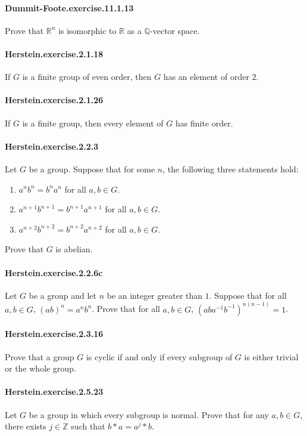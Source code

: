 \documentclass{article}
\begin{document}
\paragraph{Dummit-Foote.exercise.11.1.13} Prove that $\mathbb{R}^n$ is isomorphic to $\mathbb{R}$ as a $\mathbb{Q}$-vector space.

\paragraph{Herstein.exercise.2.1.18} If $G$ is a finite group of even order, then $G$ has an element of order $2$.

\paragraph{Herstein.exercise.2.1.26} If $G$ is a finite group, then every element of $G$ has finite order.

\paragraph{Herstein.exercise.2.2.3} Let $G$ be a group. Suppose that for some $n$, the following three statements hold:
\begin{enumerate}
\item $a^n b^n = b^n a^n$ for all $a, b \in G$.
\item $a^{n+1} b^{n+1} = b^{n+1} a^{n+1}$ for all $a, b \in G$.
\item $a^{n+2} b^{n+2} = b^{n+2} a^{n+2}$ for all $a, b \in G$.
\end{enumerate}
Prove that $G$ is abelian.

\paragraph{Herstein.exercise.2.2.6c} Let $G$ be a group and let $n$ be an integer greater than $1$. Suppose that for all $a, b\in G$, $(ab)^n=a^nb^n$. Prove that for all $a, b\in G$, $(aba^{-1}b^{-1})^{n(n-1)}=1$.

\paragraph{Herstein.exercise.2.3.16} Prove that a group $G$ is cyclic if and only if every subgroup of $G$ is either trivial or the whole group.

\paragraph{Herstein.exercise.2.5.23} Let $G$ be a group in which every subgroup is normal. Prove that for any $a, b \in G$, there exists $j \in \mathbb{Z}$ such that $b*a = a^j*b$.
\end{document}
